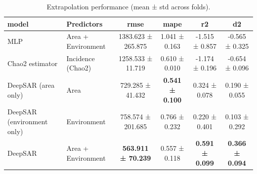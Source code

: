 \begin{table}
\caption{Extrapolation performance (mean ± std across folds).}
\label{tab:extrap_performance}
\begin{tabular}{l l c c c c}
\toprule
model & Predictors & rmse & mape & r2 & d2 \\
\midrule
MLP & Area + Environment & 1383.623 ± 265.875 & 1.041 ± 0.163 & -1.515 ± 0.857 & -0.565 ± 0.325 \\
Chao2 estimator & Incidence (Chao2) & 1258.533 ± 11.719 & 0.610 ± 0.010 & -1.174 ± 0.196 & -0.654 ± 0.096 \\
DeepSAR
(area only) & Area & 729.285 ± 41.432 & \textbf{0.541 ± 0.100} & 0.324 ± 0.078 & 0.190 ± 0.055 \\
DeepSAR
(environment
only) & Environment & 758.574 ± 201.685 & 0.766 ± 0.232 & 0.220 ± 0.401 & 0.103 ± 0.292 \\
DeepSAR & Area + Environment & \textbf{563.911 ± 70.239} & 0.557 ± 0.118 & \textbf{0.591 ± 0.099} & \textbf{0.366 ± 0.094} \\
\bottomrule
\end{tabular}
\end{table}
